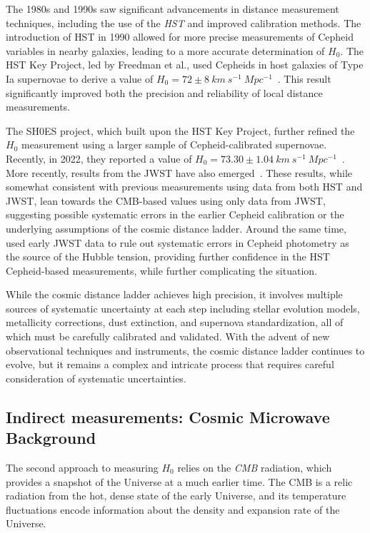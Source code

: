 The 1980s and 1990s saw significant advancements in distance measurement techniques, including the use of the \textit{\ac{HST}} and improved calibration methods. The introduction of \ac{HST} in 1990 allowed for more precise measurements of Cepheid variables in nearby galaxies, leading to a more accurate determination of $H_0$. The \ac{HST} Key Project, led by Freedman et al., used Cepheids in host galaxies of Type Ia supernovae to derive a value of $H_0 = 72 \pm 8~km~s^{-1}~Mpc^{-1}$~\citep{freedman2001final}. This result significantly improved both the precision and reliability of local distance measurements.

The \ac{SH0ES} project, which built upon the \ac{HST} Key Project, further refined the $H_0$ measurement using a larger sample of Cepheid-calibrated supernovae. Recently, in 2022, they reported a value of $H_0 = 73.30 \pm 1.04~km~s^{-1}~Mpc^{-1}$~\citep{riess2022comprehensive}. More recently, results from the \ac{JWST} have also emerged~\citep{freedman2024status}. These results, while somewhat consistent with previous measurements using data from both \ac{HST} and \ac{JWST}, lean towards the \acs{CMB}-based values using only data from \ac{JWST}, suggesting possible systematic errors in the earlier Cepheid calibration or the underlying assumptions of the cosmic distance ladder. Around the same time, \citet{riess2024jwst} used early \ac{JWST} data to rule out systematic errors in Cepheid photometry as the source of the Hubble tension, providing further confidence in the \ac{HST} Cepheid-based measurements, while further complicating the situation.

While the cosmic distance ladder achieves high precision, it involves multiple sources of systematic uncertainty at each step including stellar evolution models, metallicity corrections, dust extinction, and supernova standardization, all of which must be carefully calibrated and validated. With the advent of new observational techniques and instruments, the cosmic distance ladder continues to evolve, but it remains a complex and intricate process that requires careful consideration of systematic uncertainties.

\subsection{Indirect measurements: Cosmic Microwave Background}
The second approach to measuring $H_0$ relies on the \textit{\acf{CMB}} radiation, which provides a snapshot of the Universe at a much earlier time. The \ac{CMB} is a relic radiation from the hot, dense state of the early Universe, and its temperature fluctuations encode information about the density and expansion rate of the Universe.

